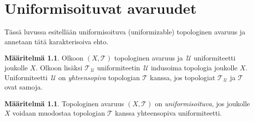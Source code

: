 \documentclass[12pt,a4paper,leqno]{report}
\newcommand{\U}{\,\mathcal{U}}
\newcommand{\T}{\mathcal{T}}
\theoremstyle{plain}
\newtheorem{kor}[equation]{Korollaari}
\theoremstyle{definition}
\newtheorem{maar}[equation]{Määritelmä}
\theoremstyle{remark}
\begin{document}
\chapter{Uniformisoituvat avaruudet}
Tässä luvussa esitellään uniformisoituva (uniformizable) topologinen avaruus ja annetaan tätä karakterisoiva ehto.
\begin{maar}
Olkoon $(X,\T)$ topologinen avaruus ja 
$\U$ uniformiteetti joukolle $X$. 
Olkoon lisäksi $\T_{\U}$ uniformiteetin $\U$ indusoima topologia joukolle $X$. 
Uniformiteetti $\U$ on \emph{yhteensopiva} topologian $\T$ kanssa, 
jos topologiat $\T_{\U}$ ja $\T$ ovat samoja.
\end{maar}
%
\begin{maar}
Topologinen avaruus $(X,\T)$ on \emph{uniformisoituva}, jos joukolle $X$ voidaan muodostaa topologian $\T$ kanssa yhteensopiva uniformiteetti.
\end{maar}
\end{document}
